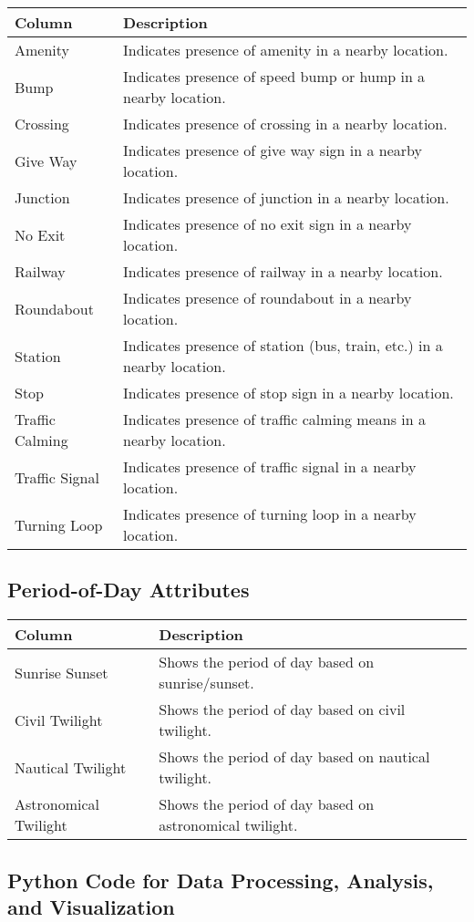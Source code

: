 \begin{longtable}[c]{l | l}
    Column & Description \\
    \hline
    Amenity & Indicates presence of amenity in a nearby location. \\
    Bump & Indicates presence of speed bump or hump in a nearby location. \\
    Crossing & Indicates presence of crossing in a nearby location. \\
    Give Way & Indicates presence of give way sign in a nearby location. \\
    Junction & Indicates presence of junction in a nearby location. \\
    No Exit & Indicates presence of no exit sign in a nearby location. \\
    Railway & Indicates presence of railway in a nearby location. \\
    Roundabout & Indicates presence of roundabout in a nearby location. \\
    Station & Indicates presence of station (bus, train, etc.) in a nearby location. \\
    Stop & Indicates presence of stop sign in a nearby location. \\
    Traffic Calming & Indicates presence of traffic calming means in a nearby location. \\
    Traffic Signal & Indicates presence of traffic signal in a nearby location. \\
    Turning Loop & Indicates presence of turning loop in a nearby location. \\
\end{longtable}

\subsection{Period-of-Day Attributes}
\label{section:pod_attrs}

\begin{longtable}[c]{l | l}
    Column & Description \\
    \hline
    Sunrise Sunset & Shows the period of day based on sunrise/sunset. \\
    Civil Twilight & Shows the period of day based on civil twilight. \\
    Nautical Twilight & Shows the period of day based on nautical twilight. \\
    Astronomical Twilight & Shows the period of day based on astronomical twilight. \\
\end{longtable}

\subsection{Python Code for Data Processing, Analysis, and Visualization}
\label{code:python}
